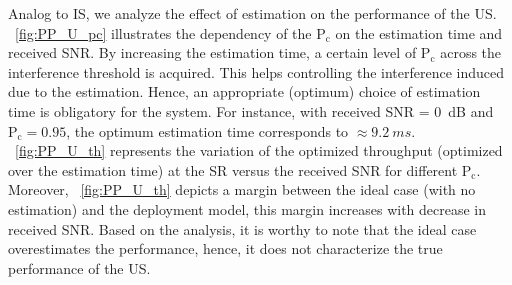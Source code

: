 \documentclass[draftcls, onecolumn, 11pt]{IEEEtran}
\newcommand{\sub}[1]{_{\text{#1}}}
\newcommand{\pc}{\text{P}\sub{c}}
\begin{document}
Analog to IS, we analyze the effect of estimation on the performance of the US. \figurename~\ref{fig:PP_U_pc} illustrates the dependency of the $\pc$ on the estimation time and received SNR. 
By increasing the estimation time, a certain level of $\pc$ across the interference threshold is acquired. This helps controlling the interference induced due to the estimation. Hence, an appropriate (optimum) choice of estimation time is obligatory for the system. 
For instance, with received SNR = \SI{0}{dB} and $\pc =0.95 $, the optimum estimation time corresponds to $\approx \SI{9.2}{ms}$. \figurename~\ref{fig:PP_U_th} represents the variation of the optimized throughput (optimized over the estimation time) at the SR versus the received SNR for different $\pc$. %
Moreover, \figurename~\ref{fig:PP_U_th} depicts a margin between the ideal case (with no estimation) and the deployment model, this margin increases with decrease in received SNR. Based on the analysis, it is worthy to note that the ideal case overestimates the performance, hence, it does not characterize the true performance of the US. 
\end{document}
